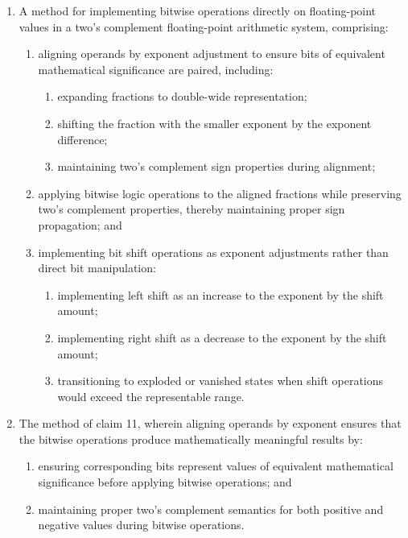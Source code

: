 \documentclass[12pt,letter]{article}
\begin{document}
\begin{enumerate}
    \item A method for implementing bitwise operations directly on floating-point values in a two's complement floating-point arithmetic system, comprising:
        \begin{enumerate}
            \item aligning operands by exponent adjustment to ensure bits of equivalent mathematical significance are paired, including:
                \begin{enumerate}
                    \item expanding fractions to double-wide representation;
                    \item shifting the fraction with the smaller exponent by the exponent difference;
                    \item maintaining two's complement sign properties during alignment;
                \end{enumerate}
            \item applying bitwise logic operations to the aligned fractions while preserving two's complement properties, thereby maintaining proper sign propagation; and
            \item implementing bit shift operations as exponent adjustments rather than direct bit manipulation:
                \begin{enumerate}
                    \item implementing left shift as an increase to the exponent by the shift amount;
                    \item implementing right shift as a decrease to the exponent by the shift amount;
                    \item transitioning to exploded or vanished states when shift operations would exceed the representable range.
                \end{enumerate}
        \end{enumerate}

    \item The method of claim 11, wherein aligning operands by exponent ensures that the bitwise operations produce mathematically meaningful results by:
        \begin{enumerate}
            \item ensuring corresponding bits represent values of equivalent mathematical significance before applying bitwise operations; and
            \item maintaining proper two's complement semantics for both positive and negative values during bitwise operations.
        \end{enumerate}


\end{enumerate}
\end{document}
